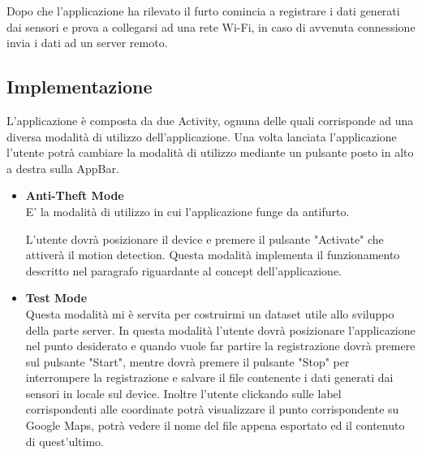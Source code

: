 \documentclass[12pt,a4paper,openright,twoside]{report}
\begin{document}
Dopo che l'applicazione ha rilevato il furto comincia a registrare i dati generati dai sensori e prova a collegarsi ad una rete Wi-Fi, in caso di avvenuta connessione invia i dati ad un server remoto.
\newpage
\subsection{Implementazione}
L'applicazione è composta da due Activity, ognuna delle quali corrisponde ad una diversa modalità di utilizzo dell'applicazione. Una volta lanciata l'applicazione l'utente potrà cambiare la modalità di utilizzo mediante un pulsante posto in alto a destra sulla AppBar.
\begin{itemize}
\item \textbf{Anti-Theft Mode}\\
E' la modalità di utilizzo in cui l'applicazione funge da antifurto. 

L'utente dovrà posizionare il device e premere il pulsante "Activate" che attiverà il motion detection. Questa modalità implementa il funzionamento descritto nel paragrafo riguardante al concept dell'applicazione.

\item \textbf{Test Mode}\\
Questa modalità mi è servita per costruirmi un dataset utile allo sviluppo della parte server. In questa modalità l'utente dovrà posizionare l'applicazione
nel punto desiderato e quando vuole far partire la registrazione dovrà premere sul pulsante "Start", mentre dovrà premere il pulsante "Stop" per interrompere la registrazione e salvare il file contenente i dati generati dai sensori in locale sul device. Inoltre l'utente clickando sulle label corrispondenti alle coordinate potrà visualizzare il punto corrispondente su Google Maps, potrà vedere il nome del file appena esportato ed il contenuto di quest'ultimo.
\end{itemize}
\end{document}
